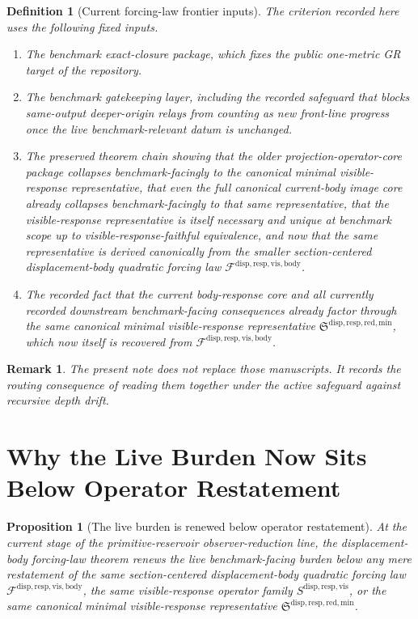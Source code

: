 \documentclass[11pt]{article}
\newcommand{\VisibleBodyForcingLaw}{\mathscr F^{\mathrm{disp,resp,vis,body}}}
\newcommand{\VisibleResponseOperator}{S^{\mathrm{disp,resp,vis}}}
\newcommand{\MinimalReducedStructure}{\mathfrak S^{\mathrm{disp,resp,red,min}}}
\newtheorem{definition}{Definition}
\newtheorem{proposition}{Proposition}
\newtheorem{remark}{Remark}
\begin{document}
\begin{definition}[Current forcing-law frontier inputs]
The criterion recorded here uses the following fixed inputs.
\begin{enumerate}
    \item The benchmark exact-closure package, which fixes the public one-metric GR target of the repository.
    \item The benchmark gatekeeping layer, including the recorded safeguard that blocks same-output deeper-origin relays from counting as new front-line progress once the live benchmark-relevant datum is unchanged.
    \item The preserved theorem chain showing that the older projection-operator-core package collapses benchmark-facingly to the canonical minimal visible-response representative, that even the full canonical current-body image core already collapses benchmark-facingly to that same representative, that the visible-response representative is itself necessary and unique at benchmark scope up to visible-response-faithful equivalence, and now that the same representative is derived canonically from the smaller section-centered displacement-body quadratic forcing law \(\VisibleBodyForcingLaw\).
    \item The recorded fact that the current body-response core and all currently recorded downstream benchmark-facing consequences already factor through the same canonical minimal visible-response representative \(\MinimalReducedStructure\), which now itself is recovered from \(\VisibleBodyForcingLaw\).
\end{enumerate}
\end{definition}

\begin{remark}
The present note does not replace those manuscripts. It records the routing consequence of reading them together under the active safeguard against recursive depth drift.
\end{remark}

\section{Why the Live Burden Now Sits Below Operator Restatement}

\begin{proposition}[The live burden is renewed below operator restatement]
At the current stage of the primitive-reservoir observer-reduction line, the displacement-body forcing-law theorem renews the live benchmark-facing burden below any mere restatement of the same section-centered displacement-body quadratic forcing law \(\VisibleBodyForcingLaw\), the same visible-response operator family \(\VisibleResponseOperator\), or the same canonical minimal visible-response representative \(\MinimalReducedStructure\).
\end{proposition}
\end{document}
